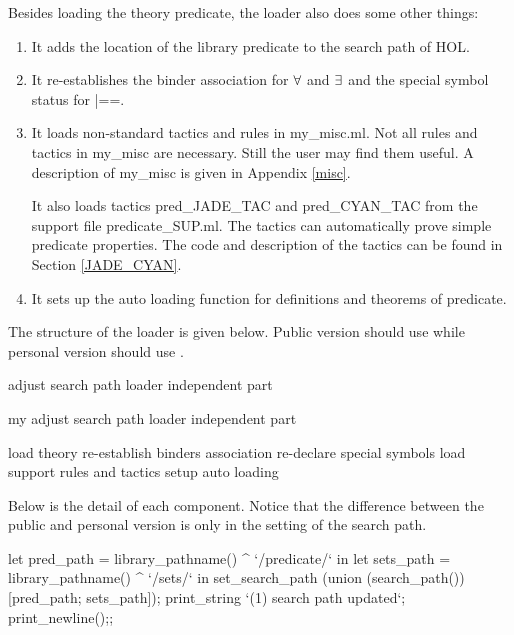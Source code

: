 Besides loading the theory \code{}predicate\edoc{}, the loader also does some
other things: 
\begin{enumerate} 
\item 
It adds the location of the library \code{}predicate\edoc{} to the search path
of HOL.  

\item 
It re-establishes the binder association for $\forall$ and $\exists$ and the
special symbol status for \code{}|==\edoc{}.

\item
It loads non-standard tactics and rules in \code{}my_misc.ml\edoc{}. Not all
rules and tactics in \code{}my_misc\edoc{} are necessary. Still the user may
find them useful. A description of \code{}my_misc\edoc{} is given in Appendix
\ref{misc}.

It also loads tactics \code{}pred_JADE_TAC\edoc{} and \code{}pred_CYAN_TAC\edoc{} from the
support file \code{}predicate_SUP.ml\edoc{}. The tactics can automatically prove
simple predicate properties. The code and description of the tactics
can be found in Section \ref{JADE_CYAN}.

\item
It sets up the auto loading function for definitions and theorems of
\code{}predicate\edoc{}.
\end{enumerate}

The structure of the loader is given below. Public version should use
 while personal version should use .

\enddocs
{}
\endmoddef
\LA{}adjust search path\RA{}
\LA{}loader independent part\RA{}

\endcode
{}
\endmoddef
\LA{}my adjust search path\RA{}
\LA{}loader independent part\RA{}

\endcode
{}
\endmoddef
\LA{}load theory\RA{}
\LA{}re-establish binders association\RA{}
\LA{}re-declare special symbols\RA{}
\LA{}load support rules and tactics\RA{}
\LA{}setup auto loading\RA{}
\endcode
{}


Below is the detail of each component. Notice that the difference
between the public and personal version is only in the setting of the
search path.

\enddocs
{}
\endmoddef
let pred_path = library_pathname() ^ `/predicate/` in
let sets_path = library_pathname() ^ `/sets/` in
    set_search_path (union (search_path()) [pred_path; sets_path]);
    print_string `(1) search path updated`; print_newline();;

